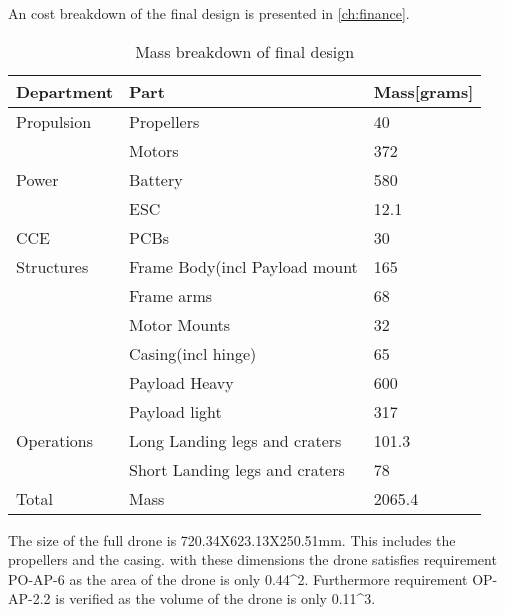 An cost breakdown of the final design is presented in \autoref{ch:finance}.

\begin{table}[H]
\centering
\caption{Mass breakdown of final design}
\label{tab:finalmassbreak}
\begin{tabular}{|l|l|l|}
\hline
\textbf{Department} & \textbf{Part} & \textbf{Mass[grams]} \\ \hline
Propulsion & Propellers & 40 \\ \cline{2-3}
            & Motors & 372 \\ \hline
Power & Battery & 580\\ \cline{2-3}
    & ESC & 12.1 \\ \hline
CCE& PCBs & 30 \\ \hline
Structures& Frame Body(incl Payload mount & 165  \\\cline{2-3}
    & Frame arms & 68 \\\cline{2-3}
    & Motor Mounts & 32  \\\cline{2-3}
    & Casing(incl hinge) & 65  \\\cline{2-3}
    & Payload Heavy & 600 \\\cline{2-3}
    & Payload light & 317  \\ \hline
Operations& Long Landing legs and craters &101.3 \\ \cline{2-3}
        & Short Landing legs and craters & 78 \\ \hline
Total & Mass & 2065.4 \\ \hline
\end{tabular}
\end{table}

The size of the full drone is 720.34X623.13X250.51mm. This includes the propellers and the casing. with these dimensions the drone satisfies requirement PO-AP-6 as the area of the drone is only 0.44\textasciicircum{}2. Furthermore requirement OP-AP-2.2 is verified as the volume of the drone is only 0.11\textasciicircum{}3.


